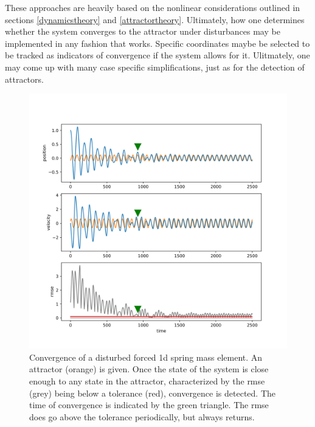  These approaches are heavily based on the nonlinear considerations outlined in sections \ref{dynamicstheory} and \ref{attractortheory}. Ultimately, how one determines whether the system converges to the attractor under disturbances may be implemented in any fashion that works. Specific coordinates maybe be selected to be tracked as indicators of convergence if the system allows for it. Ulitmately, one may come up with many case specific simplifications, just as for the detection of attractors. 

\begin{figure}[h]
\centering
\includegraphics[width=.7\textwidth]{figures/limit_cycle_convergence.png}
\caption[Convergence to Limit Cycle]{Convergence of a disturbed forced 1d spring mass element. An attractor (orange) is given. Once the state of the system is close enough to any state in the attractor, characterized by the rmse (grey) being below a tolerance (red), convergence is detected. The time of convergence is indicated by the green triangle. The rmse does go above the tolerance periodically, but always returns.}
\label{lcconv}
\end{figure}



  


